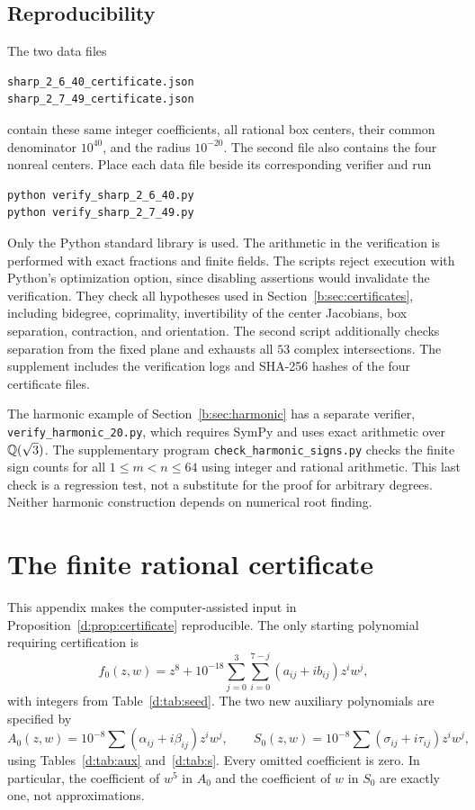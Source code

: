 \documentclass[UTF8,11pt]{ctexart}
\theoremstyle{definition}
\numberwithin{equation}{section}
\begin{document}
\subsection*{Reproducibility}
The two data files
\begin{verbatim}
sharp_2_6_40_certificate.json
sharp_2_7_49_certificate.json
\end{verbatim}
contain these same integer coefficients, all rational box centers,
their common denominator $10^{40}$, and the radius $10^{-20}$.
The second file also contains the four nonreal centers.
Place each data file beside its corresponding verifier and run
\begin{verbatim}
python verify_sharp_2_6_40.py
python verify_sharp_2_7_49.py
\end{verbatim}
Only the Python standard library is used. The arithmetic in the
verification is performed with exact fractions and finite fields.
The scripts reject execution with Python's optimization option,
since disabling assertions would invalidate the verification.
They check all hypotheses used in Section~\ref{b:sec:certificates},
including bidegree, coprimality, invertibility of the center
Jacobians, box separation, contraction, and orientation.
The second script additionally checks separation from the fixed
plane and exhausts all $53$ complex intersections.
The supplement includes the verification logs and SHA-256 hashes
of the four certificate files.

The harmonic example of Section~\ref{b:sec:harmonic} has a separate
verifier, \nolinkurl{verify_harmonic_20.py}, which requires SymPy and
uses exact arithmetic over $\mathbb Q(\sqrt3)$. The supplementary program
\nolinkurl{check_harmonic_signs.py} checks the finite sign counts for
all $1\le m<n\le64$ using integer and rational arithmetic. This last
check is a regression test, not a substitute for the proof for
arbitrary degrees. Neither harmonic construction depends on
numerical root finding.

\section{The finite rational certificate}\label{d:app:certificate}

This appendix makes the computer-assisted input in
Proposition~\ref{d:prop:certificate} reproducible. The only starting
polynomial requiring certification is
\begin{equation}\label{d:eq:seedcoeff}
 f_0(z,w)=z^8+10^{-18}
 \sum_{j=0}^3\sum_{i=0}^{7-j}(a_{ij}+ib_{ij})z^iw^j,
\end{equation}
with integers from Table~\ref{d:tab:seed}. The two new auxiliary
polynomials are specified by
\begin{equation}\label{d:eq:auxcoeff}
 A_0(z,w)=10^{-8}\sum(\alpha_{ij}+i\beta_{ij})z^iw^j,
 \qquad
 S_0(z,w)=10^{-8}\sum(\sigma_{ij}+i\tau_{ij})z^iw^j,
\end{equation}
using Tables~\ref{d:tab:aux} and~\ref{d:tab:s}. Every omitted coefficient is
zero. In particular, the coefficient of $w^5$ in $A_0$ and the
coefficient of $w$ in $S_0$ are exactly one, not approximations.
\end{document}
